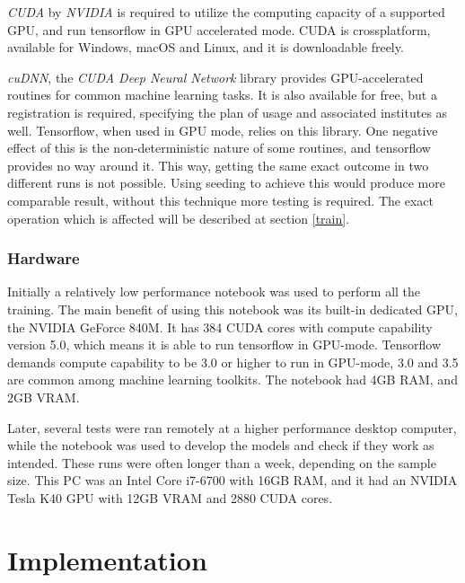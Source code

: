 \documentclass[12pt]{report}
\begin{document}
\textit{CUDA} by \textit{NVIDIA} is required to utilize the computing capacity of a supported GPU, and run tensorflow in GPU accelerated mode. CUDA is crossplatform, available for Windows, macOS and Linux, and it is downloadable freely.

\label{cudnn}
\textit{cuDNN}, the \textit{CUDA Deep Neural Network} library provides GPU-accelerated routines for common machine learning tasks. It is also available for free, but a registration is required, specifying the plan of usage and associated institutes as well. Tensorflow, when used in GPU mode, relies on this library. One negative effect of this is the non-deterministic nature of some routines, and tensorflow provides no way around it. This way, getting the same exact outcome in two different runs is not possible. Using seeding to achieve this would produce more comparable result, without this technique more testing is required. The exact operation which is affected will be described at section \ref{train}.
\subsection{Hardware}
Initially a relatively low performance notebook was used to perform all the training. The main benefit of using this notebook was its built-in dedicated GPU, the NVIDIA GeForce 840M. It has 384 CUDA cores with compute capability version 5.0, which means it is able to run tensorflow in GPU-mode. Tensorflow demands compute capability to be 3.0 or higher to run in GPU-mode, 3.0 and 3.5 are common among machine learning toolkits. The notebook had 4GB RAM, and 2GB VRAM.

Later, several tests were ran remotely at a higher performance desktop computer, while the notebook was used to develop the models and check if they work as intended. These runs were often longer than a week, depending on the sample size. This PC was an Intel Core i7-6700 with 16GB RAM, and it had an NVIDIA Tesla K40 GPU with 12GB VRAM and 2880 CUDA cores.
\chapter{Implementation}
\end{document}
